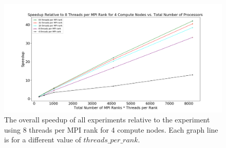 \documentclass[conference]{IEEEtran}
\begin{document}
\begin{figure}[!h]
    \centering
    \includegraphics[scale=0.25]{Figures/speedup_algo1.png}
    \caption{The overall speedup of all experiments relative to the experiment using 8 threads per MPI rank for 4 compute nodes. Each graph line is for a different value of $threads\_per\_rank$.}
    \label{speedup2}
\end{figure}
\end{document}

